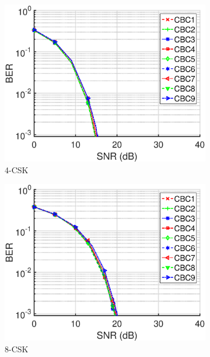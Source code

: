 \documentclass[10pt,letterpaper]{article}
\begin{document}
\begin{figure}[t]
	\centering
		\begin{subfigure}{0.49\textwidth}
		\centering
			\includegraphics[trim={0.1in 0.0in 0.6in 0.3in}, clip=true, width=\textwidth]{M04_4-CSK_BERvsSNR.eps}
			\caption{4-CSK}
			\label{fig4SNR}
		\end{subfigure}
		\hfill
		\begin{subfigure}{0.49\textwidth}
		\centering
			\includegraphics[trim={0.1in 0.0in 0.6in 0.3in}, clip=true, width=\textwidth]{M08_8-CSK_BERvsSNR.eps}
			\caption{8-CSK}
			\label{fig8SNR}
		\end{subfigure}
		\vfill
		\begin{subfigure}{0.49\textwidth}

\end{subfigure}
\end{figure}
\end{document}
